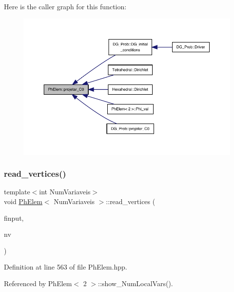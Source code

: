 Here is the caller graph for this function\+:
\nopagebreak
\begin{figure}[H]
\begin{center}
\leavevmode
\includegraphics[width=350pt]{classPhElem_aa5f168531640b2fb9ac82f85e5f8b11a_icgraph}
\end{center}
\end{figure}
\mbox{\label{classPhElem_a8abc7be8120f4192de31e0cfb32ac968}} 
\subsubsection{\texorpdfstring{read\+\_\+vertices()}{read\_vertices()}}
{\footnotesize\ttfamily template$<$int Num\+Variaveis$>$ \\
void \hyperlink{classPhElem}{Ph\+Elem}$<$ Num\+Variaveis $>$\+::read\+\_\+vertices (\begin{DoxyParamCaption}\item[{F\+I\+LE $\ast$}]{finput,  }\item[{const int \&}]{nv }\end{DoxyParamCaption})}



Definition at line 563 of file Ph\+Elem.\+hpp.



Referenced by Ph\+Elem$<$ 2 $>$\+::show\+\_\+\+Num\+Local\+Vars().

